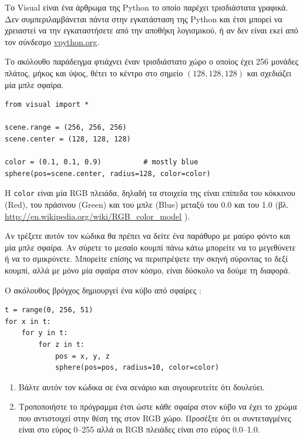\documentclass[10pt]{book}
\begin{document}
\begin{exercise}

Το  Visual  είναι ένα άρθρωμα της  Python  το οποίο παρέχει τρισδιάστατα γραφικά.  Δεν συμπεριλαμβάνεται πάντα στην εγκατάσταση της  Python  και έτσι 
μπορεί να χρειαστεί να την εγκαταστήσετε από την αποθήκη λογισμικού, ή αν δεν είναι εκεί από τον σύνδεσμο  \url{vpython.org}.

 Το ακόλουθο παράδειγμα φτιάχνει έναν τρισδιάστατο χώρο ο οποίος έχει 256 
μονάδες πλάτος, μήκος και ύψος, θέτει το κέντρο στο σημείο $(128,128,128)$ και   
σχεδιάζει μία μπλε σφαίρα. 

\begin{verbatim}
from visual import *

scene.range = (256, 256, 256)
scene.center = (128, 128, 128)

color = (0.1, 0.1, 0.9)          # mostly blue
sphere(pos=scene.center, radius=128, color=color)
\end{verbatim}

 Η  {\tt color}  είναι μία  RGB  πλειάδα, δηλαδή τα στοιχεία της είναι 
επίπεδα του κόκκινου (Red),  του πράσινου (Green)  και του μπλε (Blue) 
 μεταξύ του 0.0 και του 1.0 (βλ.  \url{http://en.wikipedia.org/wiki/RGB_color_model} ).

Αν τρέξετε αυτόν τον κώδικα θα πρέπει να δείτε ένα παράθυρο με μαύρο φόντο και μία 
μπλε σφαίρα.  Αν σύρετε το μεσαίο κουμπί πάνω κάτω μπορείτε να το μεγεθύνετε ή να το 
σμικρύνετε.  Μπορείτε επίσης να περιστρέψετε την σκηνή σύροντας το δεξί κουμπί, αλλά 
με μόνο μία σφαίρα στον κόσμο, είναι δύσκολο να δούμε τη διαφορά.

Ο ακόλουθος βρόγχος δημιουργεί ένα κύβο από σφαίρες :

\begin{verbatim}
t = range(0, 256, 51)
for x in t:
    for y in t:
        for z in t:
            pos = x, y, z
            sphere(pos=pos, radius=10, color=color)
\end{verbatim}

 
\begin{enumerate}

\item Βάλτε αυτόν τον κώδικα σε ένα σενάριο και σιγουρευτείτε ότι δουλεύει.

\item Τροποποιήστε το πρόγραμμα έτσι ώστε κάθε σφαίρα στον κύβο να έχει το χρώμα 
που αντιστοιχεί στην θέση της στον  RGB  χώρο. Προσέξτε ότι οι συντεταγμένες 
είναι στο εύρος 0--255 αλλά οι  RGB  πλειάδες είναι στο εύρος 0.0--1.0.


\end{enumerate}
\end{exercise}
\end{document}
